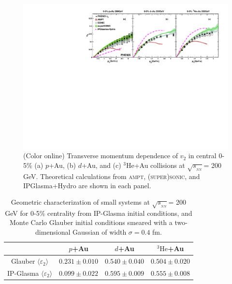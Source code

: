 \documentclass[%
reprint,
showpacs,preprintnumbers,
 amsmath,amssymb,
 aps,
]{revtex4-1}
\newcommand{\pt}{\mbox{$p_T$}\xspace}
\newcommand{\sqsn}{\mbox{$\sqrt{s_{_{NN}}}$}\xspace}
\newcommand{\dau}{\mbox{$d$+Au}\xspace}
\newcommand{\pau}{\mbox{$p$+Au}\xspace}
\newcommand{\hau}{\mbox{$^3\text{He}$+Au}\xspace}
\begin{document}
\begin{figure}[htbp]
  \includegraphics[scale=0.9]{Figures/figure4}
  \caption{(Color online) Transverse momentum dependence of $v_2$ in central 0-5\% (a) \pau, (b) \dau, and (c) \hau collisions at \sqsn = 200 GeV. Theoretical calculations from \textsc{ampt}, \textsc{(super)sonic}, and IPGlasma+Hydro are shown in each panel.}
\label{fig:figure4}
\end{figure}

\begin{table}
\caption{Geometric characterization of small systems at \sqsn = 200 GeV for 0-5\% centrality from IP-Glasma initial conditions, and Monte Carlo Glauber initial conditions smeared with a two-dimensional Gaussian of width $\sigma=0.4$ fm.}
\begin{ruledtabular}
\begin{tabular}{c c c c}
\label{table_geometry_glasma}
 & \pau & \dau & \hau \\ \hline
 Glauber $\langle \varepsilon_2 \rangle$ & $0.231\pm 0.010$ & $0.540\pm 0.040$ & $0.504\pm 0.020$ \\
 IP-Glasma $\langle \varepsilon_2 \rangle$ & $0.099\pm 0.022$ & $0.595\pm 0.009$ & $0.555\pm 0.008$ \\
\end{tabular}
\end{ruledtabular}
\end{table}
\end{document}
